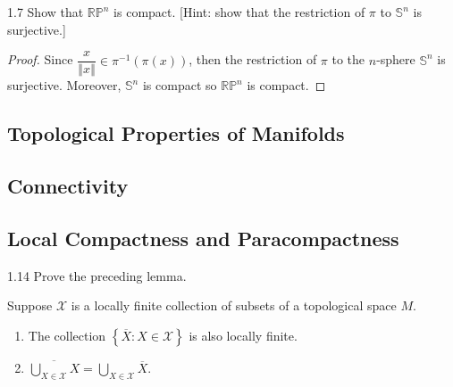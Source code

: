 \begin{exercise}{1.7}
    Show that \( \mathbb{RP}^{n} \) is compact. [Hint: show that the restriction of \( \pi \) to \( \mathbb{S}^{n} \) is surjective.]
\end{exercise}

\begin{proof}
    Since \( \dfrac{x}{\left\Vert x \right\Vert} \in \pi^{-1}(\pi(x)) \), then the restriction of \( \pi \) to the \( n \)-sphere \( \mathbb{S}^{n} \) is surjective. Moreover, \( \mathbb{S}^{n} \) is compact so \( \mathbb{RP}^{n} \) is compact.
\end{proof}

\subsection{Topological Properties of Manifolds}

\subsection{Connectivity}

\subsection{Local Compactness and Paracompactness}

\begin{exercise}{1.14}
    Prove the preceding lemma.

    Suppose \( \mathcal{X} \) is a locally finite collection of subsets of a topological space \( M \).
    \begin{enumerate}[topsep=0pt,itemsep=0pt,label={(\alph*)}]
        \item The collection \( \left\{ \overline{X} : X \in \mathcal{X} \right\} \) is also locally finite.
        \item \( \overline{\bigcup_{X \in \mathcal{X}} X} = \bigcup_{X \in \mathcal{X}} \overline{X} \).
    \end{enumerate}
\end{exercise}

